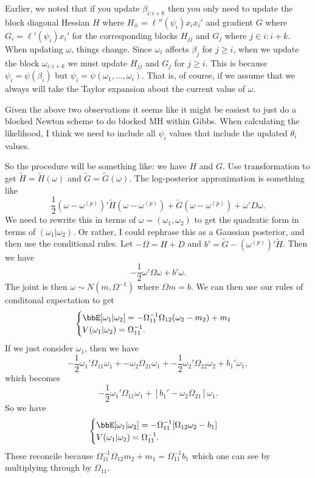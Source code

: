 \documentclass{article}
\begin{document}
Earlier, we noted that if you update $\beta_{i:i+k}$ then you only need to
update the block diagonal Hessian $H$ where $H_{ii} = \ell''(\psi_i) x_ix_i'$
and gradient $G$ where $G_i = \ell'(\psi_i) x_i'$ for the corresponding blocks
$H_{jj}$ and $G_j$ where $j \in i:i+k$.  When updating $\omega$, things change.
Since $\omega_i$ affects $\beta_{j}$ for $j \geq i$, when we update the block
$\omega_{i:i+k}$ we must update $H_{jj}$ and $G_j$ for $j \geq i$.  This is
because $\psi_i = \psi(\beta_i)$ but $\psi_i = \psi(\omega_1, \ldots,
\omega_i)$.  That is, of course, if we assume that we always will take the
Taylor expansion about the current value of $\omega$.

Given the above two observations it seems like it might be easiest to just do a
blocked Newton scheme to do blocked MH within Gibbs.  When calculating the
likelihood, I think we need to include all $\psi_i$ values that include the
updated $\theta_i$ values.

So the procedure will be something like: we have $H$ and $G$.  Use
transformation to get $\tilde H = \tilde H(\omega)$ and $\tilde G = \tilde
G(\omega)$.  The log-posterior approximation is something like
\[
\frac{1}{2} (\omega - \omega^{(p)})' \tilde H (\omega - \omega^{(p)}) + \tilde G (\omega -
\omega^{(p)})
+ \omega' D \omega.
\]
We need to rewrite this in terms of $\omega = (\omega_1, \omega_2)$ to get the
quadratic form in terms of $(\omega_1 | \omega_2)$.  Or rather, I could rephrase
this as a Gaussian posterior, and then use the conditional rules.  Let $-\Omega =
H + D$ and $b' = \tilde G - (\omega^{(p)})' \tilde H$.  Then we have
\[
-\frac{1}{2} \omega' \Omega \omega + b' \omega.
\]
The joint is then $\omega \sim N(m, \Omega^{-1})$ where $\Omega m = b$.  We can
then use our rules of conditonal expectation to get
\[
\begin{cases}
\bbE[\omega_1|\omega_2] = -\Omega_{11}^{-1} \Omega_{12} (\omega_2 - m_2) + m_1 \\
V(\omega_1 | \omega_2) = \Omega_{11}^{-1}.
\end{cases}
\]
If we just consider $\omega_1$, then we have
\[
-\frac{1}{2} \omega_{1}' \Omega_{11} \omega_1 +  -\omega_2 \Omega_{21} \omega_1 +
-\frac{1}{2} \omega_2' \Omega_{22} \omega_2 + b_1' \omega_1,
\]
which becomes
\[
-\frac{1}{2} \omega_{1} ' \Omega_{11} \omega_1 + [b_1' - \omega_2 \Omega_{21}] \omega_1.
\]
So we have 
\[
\begin{cases}
\bbE[\omega_1 | \omega_2] = - \Omega_{11}^{-1} [\Omega_{12} \omega_2 - b_1] \\
V(\omega_1 | \omega_2) = \Omega_{11}^{-1}.
\end{cases}
\]
These reconcile because $\Omega_{11}^{-1} \Omega_{12} m_2 + m_1 =
\Omega_{11}^{-1} b_1$ which one can see by multiplying through by $\Omega_{11}$.
\end{document}
